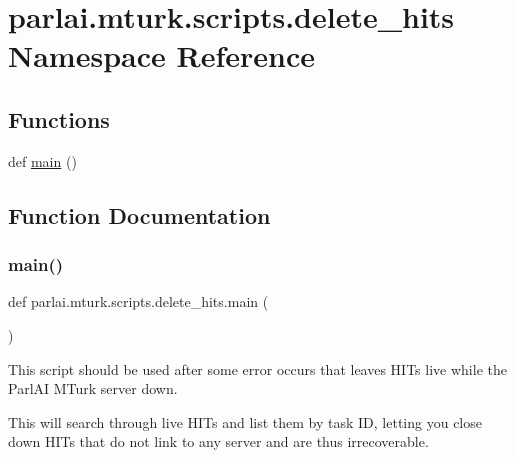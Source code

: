 \hypertarget{namespaceparlai_1_1mturk_1_1scripts_1_1delete__hits}{}\section{parlai.\+mturk.\+scripts.\+delete\+\_\+hits Namespace Reference}
\label{namespaceparlai_1_1mturk_1_1scripts_1_1delete__hits}
\subsection*{Functions}
\begin{DoxyCompactItemize}
\item 
def \hyperlink{namespaceparlai_1_1mturk_1_1scripts_1_1delete__hits_a8dd24ac1eb6692d9295969d598138d05}{main} ()
\end{DoxyCompactItemize}


\subsection{Function Documentation}
\mbox{\label{namespaceparlai_1_1mturk_1_1scripts_1_1delete__hits_a8dd24ac1eb6692d9295969d598138d05}} 
\subsubsection{\texorpdfstring{main()}{main()}}
{\footnotesize\ttfamily def parlai.\+mturk.\+scripts.\+delete\+\_\+hits.\+main (\begin{DoxyParamCaption}{ }\end{DoxyParamCaption})}

\begin{DoxyVerb}This script should be used after some error occurs that leaves HITs live while the
ParlAI MTurk server down.

This will search through live HITs and list them by task ID, letting you close down
HITs that do not link to any server and are thus irrecoverable.
\end{DoxyVerb}
 